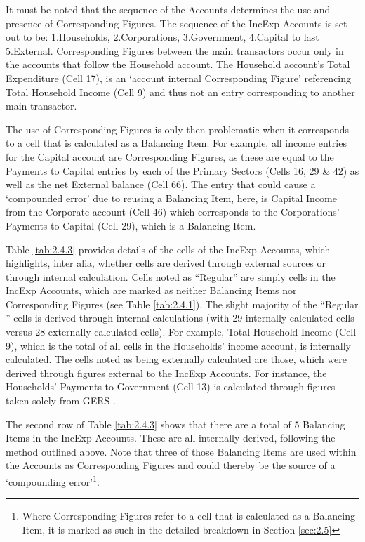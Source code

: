\bigskip

It must be noted that the sequence of the Accounts determines the use and presence of Corresponding Figures. The sequence of the IncExp Accounts is set out to be: 1.Households, 2.Corporations, 3.Government, 4.Capital to last 5.External. Corresponding Figures between the main transactors occur only in the accounts that follow the Household account. The Household account's Total Expenditure (Cell 17), is an `account internal Corresponding Figure' referencing Total Household Income (Cell 9) and thus not an entry corresponding to another main transactor.

\bigskip

The use of Corresponding Figures is only then problematic when it corresponds to a cell that is calculated as a Balancing Item. For example, all income entries for the Capital account are Corresponding Figures, as these are equal to the Payments to Capital entries by each of the Primary Sectors (Cells 16, 29 \& 42) as well as the net External balance (Cell 66). The entry that could cause a `compounded error' due to reusing a Balancing Item, here, is Capital Income from the Corporate account (Cell 46) which corresponds to the Corporations' Payments to Capital (Cell 29), which is a Balancing Item.

\bigskip

Table \ref{tab:2.4.3} provides details of the cells of the IncExp Accounts, which highlights, inter alia, whether cells are derived through external sources or through internal calculation. Cells noted as ``Regular'' are simply cells in the IncExp Accounts, which are marked as neither Balancing Items nor Corresponding Figures (see Table \ref{tab:2.4.1}). The slight majority of the ``Regular '' cells is derived through internal calculations (with 29 internally calculated cells versus 28 externally calculated cells). For example, Total Household Income (Cell 9), which is the total of all cells in the Households' income account, is internally calculated. The cells noted as being externally calculated are those, which were derived through figures external to the IncExp Accounts. For instance, the Households' Payments to Government (Cell 13) is calculated through figures taken solely from GERS \cite{ScotGov2013b}.

\bigskip

The second row of Table \ref{tab:2.4.3} shows that there are a total of 5 Balancing Items in the IncExp Accounts. These are all internally derived, following the method outlined above. Note that three of those Balancing Items are used within the Accounts as Corresponding Figures and could thereby be the source of a `compounding error'\footnote{Where Corresponding Figures refer to a cell that is calculated as a Balancing Item, it is marked as such in the detailed breakdown in Section \ref{sec:2.5}}.

